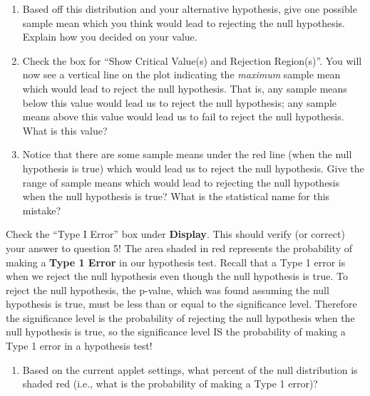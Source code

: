 \documentclass[
]{report}
\providecommand{\tightlist}{%
  \setlength{\itemsep}{0pt}\setlength{\parskip}{0pt}}
\begin{document}
\begin{enumerate}
\def\labelenumi{\arabic{enumi}.}
\setcounter{enumi}{2}
\item
  Based off this distribution and your alternative hypothesis, give one possible sample mean which you think would lead to rejecting the null hypothesis. Explain how you decided on your value.
  \vspace{0.4in}
\item
  Check the box for ``Show Critical Value(s) and Rejection Region(s)''. You will now see a vertical line on the plot indicating the \emph{maximum} sample mean which would lead to reject the null hypothesis. That is, any sample means below this value would lead us to reject the null hypothesis; any sample means above this value would lead us to fail to reject the null hypothesis. What is this value?\\
  \vspace{0.4in}
\item
  Notice that there are some sample means under the red line (when the null hypothesis is true) which would lead us to reject the null hypothesis. Give the range of sample means which would lead to rejecting the null hypothesis when the null hypothesis is true? What is the statistical name for this mistake?
  \vspace{0.4in}
\end{enumerate}

\newpage

Check the ``Type I Error'' box under \textbf{Display}. This should verify (or correct) your answer to question 5! The area shaded in red represents the probability of making a \textbf{Type 1 Error} in our hypothesis test. Recall that a Type 1 error is when we reject the null hypothesis even though the null hypothesis is true. To reject the null hypothesis, the p-value, which was found assuming the null hypothesis is true, must be less than or equal to the significance level. Therefore the significance level is the probability of rejecting the null hypothesis when the null hypothesis is true, so the significance level IS the probability of making a Type 1 error in a hypothesis test!

\begin{enumerate}
\def\labelenumi{\arabic{enumi}.}
\setcounter{enumi}{5}
\tightlist
\item
  Based on the current applet settings, what percent of the null distribution is shaded red (i.e., what is the probability of making a Type 1 error)?
  \vspace{0.2in}
\end{enumerate}
\end{document}
